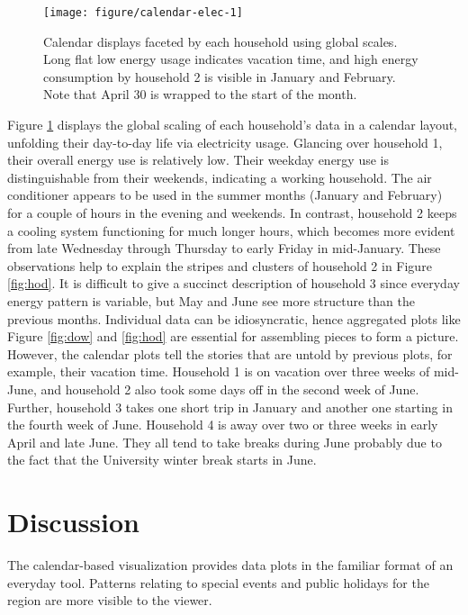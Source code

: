 \documentclass[12pt]{article}
\begin{document}
\begin{figure}

{\centering \texttt{[image: figure/calendar-elec-1]} 

}

\caption{Calendar displays faceted by each household using global scales. Long flat low energy usage indicates vacation time, and high energy consumption by household 2 is visible in January and February. Note that April 30 is wrapped to the start of the month.}\label{fig:calendar-elec}
\end{figure}



Figure \ref{fig:calendar-elec} displays the global scaling of each household's data in a calendar layout, unfolding their day-to-day life via electricity usage. Glancing over household 1, their overall energy use is relatively low. Their weekday energy use is distinguishable from their weekends, indicating a working household. The air conditioner appears to be used in the summer months (January and February) for a couple of hours in the evening and weekends. In contrast, household 2 keeps a cooling system functioning for much longer hours, which becomes more evident from late Wednesday through Thursday to early Friday in mid-January. These observations help to explain the stripes and clusters of household 2 in Figure \ref{fig:hod}. It is difficult to give a succinct description of household 3 since everyday energy pattern is variable, but May and June see more structure than the previous months. Individual data can be idiosyncratic, hence aggregated plots like Figure \ref{fig:dow} and \ref{fig:hod} are essential for assembling pieces to form a picture. However, the calendar plots tell the stories that are untold by previous plots, for example, their vacation time. Household 1 is on vacation over three weeks of mid-June, and household 2 also took some days off in the second week of June. Further, household 3 takes one short trip in January and another one starting in the fourth week of June. Household 4 is away over two or three weeks in early April and late June. They all tend to take breaks during June probably due to the fact that the University winter break starts in June.

\hypertarget{sec:discussion}{%
\section{Discussion}\label{sec:discussion}}

The calendar-based visualization provides data plots in the familiar format of an everyday tool. Patterns relating to special events and public holidays for the region are more visible to the viewer.
\end{document}
